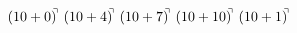 \documentclass[preview]{standalone}
\begin{document}
\begin{align*}
(10+0)^{\hspace{-0.1cm}\urcorner} \ (10+4)^{\hspace{-0.1cm}\urcorner} \ (10+7)^{\hspace{-0.1cm}\urcorner} \ (10+10)^{\hspace{-0.1cm}\urcorner} \ (10+1)^{\hspace{-0.1cm}\urcorner}
\end{align*}
\end{document}

